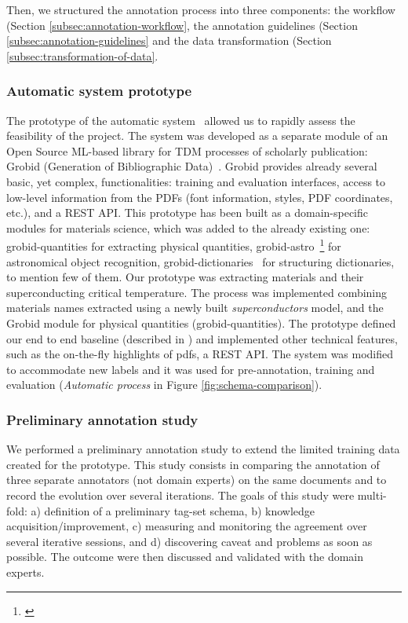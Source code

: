 \documentclass[a4paper,10pt]{article}
\begin{document}
Then, we structured the annotation process into three components: the workflow (Section \ref{subsec:annotation-workflow}, the annotation guidelines (Section \ref{subsec:annotation-guidelines} and the data transformation (Section \ref{subsec:transformation-of-data}. 


\subsubsection{Automatic system prototype}
\label{subsec:automatic-system-prototype}
The prototype of the automatic system~\cite{foppiano2019proposal} allowed us to rapidly assess the feasibility of the project. 
The system was developed as a separate module of an Open Source ML-based library for TDM processes of scholarly publication: Grobid (Generation of Bibliographic Data)~\cite{GROBID}. 
Grobid provides already several basic, yet complex, functionalities: training and evaluation interfaces, access to low-level information from the PDFs (font information, styles, PDF coordinates, etc.), and a REST API. 
This prototype has been built as a domain-specific modules for materials science, which was added to the already existing one: grobid-quantities\cite{foppiano2019quantities} for extracting physical quantities, grobid-astro~\footnote{\url{}} for astronomical object recognition, grobid-dictionaries~\cite{grobid-dictionaries} for structuring dictionaries, to mention few of them. 
Our prototype was extracting materials and their superconducting critical temperature. The process was implemented combining materials names extracted using a newly built \textit{superconductors} model, and the Grobid module for physical quantities (grobid-quantities).
The prototype defined our end to end baseline (described in \cite{foppiano2019proposal}) and implemented other technical features, such as the on-the-fly highlights of pdfs, a REST API. 
The system was modified to accommodate new labels and it was used for pre-annotation, training and evaluation (\textit{Automatic process} in Figure \ref{fig:schema-comparison}).

\subsubsection{Preliminary annotation study}
\label{subsec:preliminary-annotation-study}

We performed a preliminary annotation study to extend the limited training data created for the prototype. This study consists in comparing the annotation of three separate annotators (not domain experts) on the same documents and to record the evolution over several iterations. 
The goals of this study were multi-fold: a) definition of a preliminary tag-set schema, b) knowledge acquisition/improvement, c) measuring and monitoring the agreement over several iterative sessions, and d) discovering caveat and problems as soon as possible. 
The outcome were then discussed and validated with the domain experts. 
\end{document}
